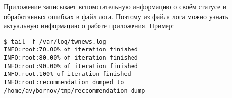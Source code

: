         Приложение записывает вспомогательную информацию о своём статусе и обработанных ошибках в файл лога.
        Поэтому из файла лога можно узнать актуальную информацию о работе приложения. Пример:
        \begin{lstlisting}
$ tail -f /var/log/twnews.log
INFO:root:70.00% of iteration finished
INFO:root:80.00% of iteration finished
INFO:root:90.00% of iteration finished
INFO:root:100% of iteration finished
INFO:root:recommendation dumped to /home/avybornov/tmp/reccommendation_dump
        \end{lstlisting}